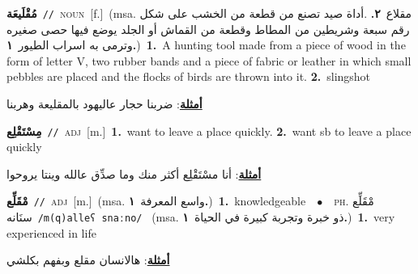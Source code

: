 \documentclass[10pt,a4paper,twoside]{article} %
\begin{document}
\begin{multicols}{2}
{\setlength\topsep{0pt}\textbf{\foreignlanguage{arabic}{مُقْلَيعَة}}\ {\color{gray}\texttt{//}\color{black}}\ \textsc{noun}\ [f.]\ \color{gray}(msa. \foreignlanguage{arabic}{مقلاع}~\foreignlanguage{arabic}{\textbf{٢.}}  .\foreignlanguage{arabic}{أداة صيد تصنع من قطعة من الخشب على شكل رقم سبعة وشريطين من المطاط وقطعة من القماش أو الجلد يوضع فيها حصى صغيره وترمى به اسراب الطيور}~\foreignlanguage{arabic}{\textbf{١.}})\color{black}\ \textbf{1.}~A hunting tool made from a piece of wood in the form of letter V,  two rubber bands and a piece of fabric or leather in which small pebbles are placed and the flocks of birds are thrown into it.  \textbf{2.}~slingshot\  \begin{flushright}\color{gray}\foreignlanguage{arabic}{\textbf{\underline{\foreignlanguage{arabic}{أمثلة}}}: ضربنا حجار عاليهود بالمقليعة وهربنا}\end{flushright}\color{black}} \vspace{2mm}

{\setlength\topsep{0pt}\textbf{\foreignlanguage{arabic}{مِسْتَقْلِع}}\ {\color{gray}\texttt{//}\color{black}}\ \textsc{adj}\ [m.]\ \textbf{1.}~want to leave a place quickly.  \textbf{2.}~want sb to leave a place quickly\  \begin{flushright}\color{gray}\foreignlanguage{arabic}{\textbf{\underline{\foreignlanguage{arabic}{أمثلة}}}: أنا مسْتَقْلِع أكثر منك وما صدِّق عالله وينتا يروحوا}\end{flushright}\color{black}} \vspace{2mm}

{\setlength\topsep{0pt}\textbf{\foreignlanguage{arabic}{مْقَلِّع}}\ {\color{gray}\texttt{//}\color{black}}\ \textsc{adj}\ [m.]\ \color{gray}(msa. \foreignlanguage{arabic}{واسع المعرفة}~\foreignlanguage{arabic}{\textbf{١.}})\color{black}\ \textbf{1.}~knowledgeable\ \ $\bullet$\ \ \textsc{ph.} \color{gray} \foreignlanguage{arabic}{مْقَلِّع سنَانه}\color{black}\ {\color{gray}\texttt{/{\sffamily m(q)alleʕ snaːno}/}\color{black}}\ \color{gray} (msa. \foreignlanguage{arabic}{ذو خبرة وتجربة كبيرة في الحياة}~\foreignlanguage{arabic}{\textbf{١.}})\color{black}\ \textbf{1.}~very experienced in life\  \begin{flushright}\color{gray}\foreignlanguage{arabic}{\textbf{\underline{\foreignlanguage{arabic}{أمثلة}}}: هالانسان مقلع وبفهم بكلشي}\end{flushright}\color{black}} \vspace{2mm}


\end{multicols}
\end{document}
